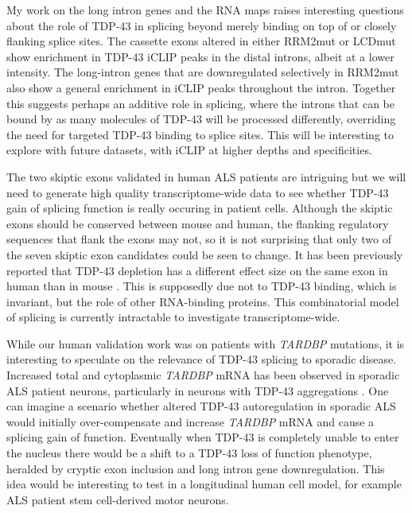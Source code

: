  My work on the long intron genes and the RNA maps raises interesting questions about the role of TDP-43 in splicing beyond merely binding on top of or closely flanking splice sites. 
 The cassette exons altered in either RRM2mut or LCDmut show enrichment in TDP-43 iCLIP peaks in the distal introns, albeit at a lower intensity. 
 The long-intron genes that are downregulated selectively in RRM2mut also show a general enrichment in iCLIP peaks throughout the intron. 
 Together this suggests perhaps an additive role in splicing, where the introns that can be bound by as many molecules of TDP-43 will be processed differently, overriding the need for targeted TDP-43 binding to splice sites.
 This will be interesting to explore with future datasets, with iCLIP at higher depths and specificities. 

 
 The two skiptic exons validated in human ALS patients are intriguing but we will need to generate high quality transcriptome-wide data to see whether TDP-43 gain of splicing function is really occuring in patient cells.
 Although the skiptic exons should be conserved between mouse and human, the flanking regulatory sequences that flank the exons may not, so it is not surprising that only two of the seven skiptic exon candidates could be seen to change. It has been previously reported that TDP-43 depletion has a different effect size on the same exon in human than in mouse \cite{Mohagheghi2016}. 
 This is supposedly due not to TDP-43 binding, which is invariant, but the role of other RNA-binding proteins.
This combinatorial model of splicing is currently intractable to investigate transcriptome-wide. %
 
 While our human validation work was on patients with \textit{TARDBP} mutations, it is interesting to speculate on the relevance of TDP-43 splicing to sporadic disease. 
 Increased total and cytoplasmic \textit{TARDBP} mRNA has been observed in sporadic ALS patient neurons, particularly in neurons with TDP-43 aggregations \citep{Koyama2016}.
 One can imagine a scenario whether altered TDP-43 autoregulation in sporadic ALS would initially over-compensate and increase \textit{TARDBP} mRNA and cause a splicing gain of function.
 Eventually when TDP-43 is completely unable to enter the nucleus there would be a shift to a TDP-43 loss of function phenotype, heralded by cryptic exon inclusion and long intron gene downregulation.  
 This idea would be interesting to test in a longitudinal human cell model, for example ALS patient stem cell-derived motor neurons.
 
